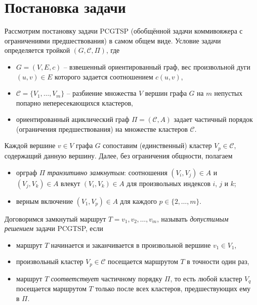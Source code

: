 
\section{Постановка задачи}
\label{sec:pcgtsp-stmt}

Рассмотрим постановку задачи PCGTSP
(обобщённой задачи коммивояжера с ограничениями предшествования)
в самом общем виде.
Условие задачи определяется тройкой
$(G,\mathcal C,\Pi)$,
где
\begin{itemize}
  \item
	$G=(V,E,c)$
  -- взвешенный ориентированный граф,
  вес произвольной дуги $(u,v)\in E$
  которого задается соотношением
  $c(u,v)$,
  \item
	$\mathcal C=\{V_1,\ldots,V_m\}$
  -- разбиение множества $V$
  вершин графа $G$ на $m$
  непустых попарно непересекающихся кластеров,
  \item
	ориентированный ациклический граф
  $ \Pi = (\mathcal C, A) $
  задает частичный порядок
  (ограничения предшествования)
  на множестве кластеров
  $\mathcal C$.
\end{itemize}

Каждой вершине
$v\in V$
графа $G$
сопоставим
(единственный)
кластер
$V_p\in\mathcal C$,
содержащий данную вершину.
Далее, без ограничения общности, полагаем
\begin{itemize}
  \item
  орграф $\Pi$
  \textit{транзитивно замкнутым}:
  соотношения $(V_i,V_j)\in A$ и $(V_j,V_k)\in A$
  влекут $(V_i,V_k)\in A$
  для произвольных индексов $i$, $j$ и $k$;
  \item
  верным включение
  $(V_1,V_p)\in A$
  для каждого
  $p\in\{2,\ldots,m\}$.
\end{itemize}

Договоримся замкнутый маршрут
$T=v_1, v_2, \ldots, v_m$,
называть \textit{допустимым решением} задачи PCGTSP,
если
\begin{itemize}
  \item
  маршрут $T$ начинается и заканчивается в произвольной вершине
  $v_1\in V_1$,
  \item
  произвольный кластер
  $V_p\in\mathcal C$
  посещается маршрутом $T$ в точности один раз,
  \item
  маршрут $T$ \textit{соответствует} частичному порядку
  $\Pi$,
  то есть любой кластер $V_q$
  посещается маршрутом $T$
  только после всех кластеров,
  предшествующих ему в $\Pi$.
\end{itemize}

